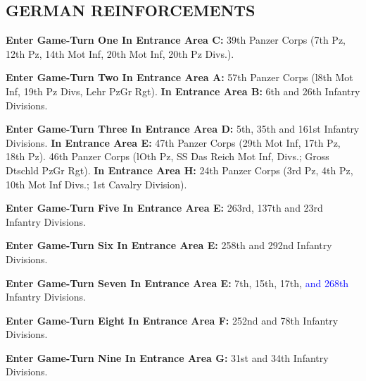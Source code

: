 \subsection{GERMAN REINFORCEMENTS}

\begin{flushleft}
  \textbf{Enter Game-Turn One In Entrance Area C:}
  \break
  39th Panzer Corps (7th Pz, 12th Pz, 14th Mot Inf,
  20th Mot Inf, 20th Pz Divs.).

  \textbf{Enter Game-Turn Two In Entrance Area A:}
  \break
  57th Panzer Corps (l8th Mot Inf, 19th Pz Divs, Lehr PzGr Rgt).
  \break
  \textbf{In Entrance Area B:}
  \break
  6th and 26th Infantry Divisions.

  \textbf{Enter Game-Turn Three In Entrance Area D:}
  \break
  5th, 35th and 161st Infantry Divisions.
  \break
  \textbf{In Entrance Area E:}
  \break
  47th Panzer Corps (29th Mot Inf, 17th Pz, 18th Pz).
  46th Panzer Corps (lOth Pz, SS Das Reich Mot Inf, Divs.; Gross Dtschld PzGr Rgt).
  \break
  \textbf{In Entrance Area H:}
  24th Panzer Corps (3rd Pz, 4th Pz, 10th Mot Inf Divs.; 1st Cavalry Division).

  \textbf{Enter Game-Turn Five In Entrance Area E:}
  \break
  263rd, 137th and 23rd Infantry Divisions.

  \textbf{Enter Game-Turn Six In Entrance Area E:}
  \break
  258th and 292nd Infantry Divisions.

  \textbf{Enter Game-Turn Seven In Entrance Area E:}
  \break
  7th, 15th, 17th, \textcolor{blue}{and 268th} Infantry Divisions.

  \textbf{Enter Game-Turn Eight In Entrance Area F:}
  \break
  252nd and 78th Infantry Divisions.

  \textbf{Enter Game-Turn Nine In Entrance Area G:}
  \break
  31st and 34th Infantry Divisions.
\end{flushleft}
\vfill